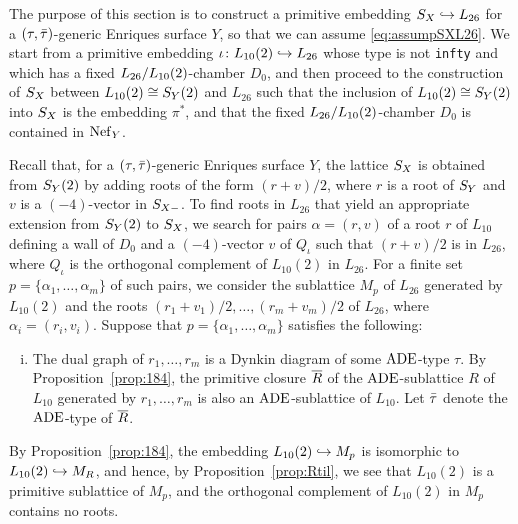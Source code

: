 \documentclass{amsart}
\numberwithin{procedure}{section}
\begin{document}
%
The purpose of this section is 
to construct a primitive embedding $S_{X}\hookrightarrow L_{26}$ 
for a $(\tau, \bar{\tau})$-generic Enriques surface $Y$, so that we can assume
\eqref{eq:assumpSXL26}.
We start from a  primitive embedding
$\iota\colon L_{10}(2)\hookrightarrow L_{26}$
whose type  is not {\tt infty} and which has  a fixed  $L_{26}/L_{10}(2)$-chamber $D_0$,
and then proceed to
the  construction of $S_{X}$  between $L_{10}(2)\cong S_{Y}(2)$ and $L_{26}$
such that the inclusion of 
$L_{10}(2)\cong S_{Y}(2)$ into $S_{X}$ is the embedding $\pi^*$,
and that the fixed $L_{26}/L_{10}(2)$-chamber $D_0$ is contained in $\mathord{\rm Nef}_{Y}$.
\par
Recall that, for a $(\tau, \bar{\tau})$-generic Enriques surface $Y$,
the lattice $S_{X}$ 
is obtained from $S_{Y}(2)$ by adding roots 
of the form $(r+v)/2$,
where 
$r$ is a root of $S_{Y}$ and $v$ is a $(-4)$-vector 
in $S_{X-}$.
To find roots in $L_{26}$ that yield 
an appropriate extension from $S_{Y}(2)$ to $S_{X}$,
we search for pairs
$\alpha=(r, v)$ of a root $r$ of $L_{10}$ defining a wall of $D_0$
and a $(-4)$-vector $v$ of 
$Q_{\iota}$
such  that $(r+v)/2$ is in $L_{26}$,
where $Q_{\iota}$ is the orthogonal complement of $L_{10}(2)$ in $L_{26}$.
For a finite set
$p=\{\alpha_1, \dots, \alpha_m\}$
of such pairs,
we consider the sublattice $M_p$
of $L_{26}$ generated by
$L_{10}(2)$ and the roots
$(r_1+v_1)/2, \dots, (r_m+v_m)/2$ of $L_{26}$,
where  $\alpha_i=(r_i, v_i)$.
Suppose that $p=\{\alpha_1, \dots, \alpha_m\}$ satisfies the following:
%
\begin{enumerate}[(i)]
%
\item %

The dual graph of
$r_1, \dots, r_m$ is a Dynkin diagram of some $\mathord{\rm ADE}$-type $\tau$.
By Proposition~\ref{prop:184}, 
the primitive closure  $\overline{R}$ of
the  $\mathord{\rm ADE}$-sublattice $R$ of $L_{10}$ generated by $r_1, \dots, r_m$
is also an $\mathord{\rm ADE}$-sublattice of $L_{10}$.
Let  $\bar{\tau}$ denote the $\mathord{\rm ADE}$-type of $\overline{R}$.
%
\end{enumerate}
%
By Proposition~\ref{prop:184}, 
 the embedding $L_{10} (2) \hookrightarrow M_p$ is isomorphic to $L_{10}  (2) \hookrightarrow M_R$,
 and hence,  by Proposition~\ref{prop:Rtil}, 
 we see that $L_{10}(2)$ is a primitive sublattice of $M_p$,
 and  the orthogonal complement  of $L_{10}(2)$ in $M_p$
contains no roots.
\end{document}
